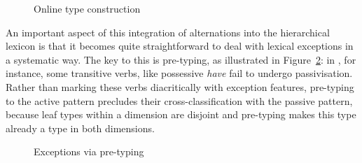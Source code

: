 \documentclass[output=paper
 	        ,biblatex
                ,babelshorthands
                ,newtxmath
                ,draftmode
                ,colorlinks, citecolor=brown
]{langscibook}
\begin{document}
\begin{figure}
  \caption{Online type construction}
  \label{fig:KoenigDyn}
\end{figure}

An important aspect of this integration of alternations into the
hierarchical lexicon is that it becomes quite straightforward to deal
with lexical exceptions in a systematic way. The key to this is
pre-typing, as illustrated in Figure~\ref{fig:KoenigPre}: in , for instance, some transitive verbs, like
possessive \textit{have} fail to undergo passivisation. Rather than
marking these verbs diacritically with exception features, pre-typing to the
active pattern precludes their cross-classification with the passive
pattern, because leaf types within a dimension are disjoint and
pre-typing makes this type already a type in both dimensions.

\begin{figure}
  \centering




  \caption{Exceptions via pre-typing}
  \label{fig:KoenigPre}
\end{figure}
\end{document}
